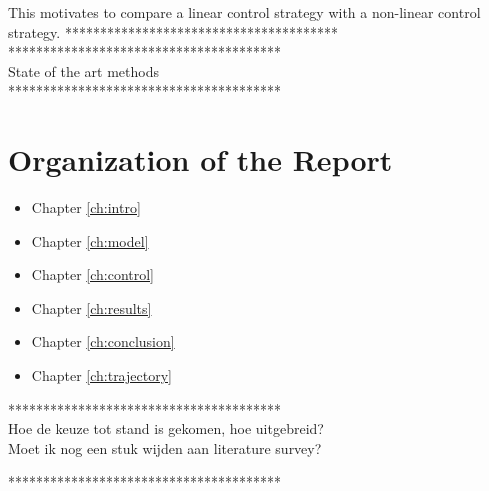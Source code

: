     				This motivates to compare a linear control strategy with a non-linear control strategy. 
%    
    ***************************************\\


            ***************************************\\

State of the art methods\\


***************************************\\

\section{Organization of the Report}
\begin{itemize}
	\item Chapter \ref{ch:intro}
	\item Chapter \ref{ch:model}
	\item Chapter \ref{ch:control}
	\item Chapter \ref{ch:results}
	\item Chapter \ref{ch:conclusion}
	\item Chapter \ref{ch:trajectory}
\end{itemize}

***************************************\\
Hoe de keuze tot stand is gekomen, hoe uitgebreid? \\
Moet ik nog een stuk wijden aan literature survey?

***************************************\\